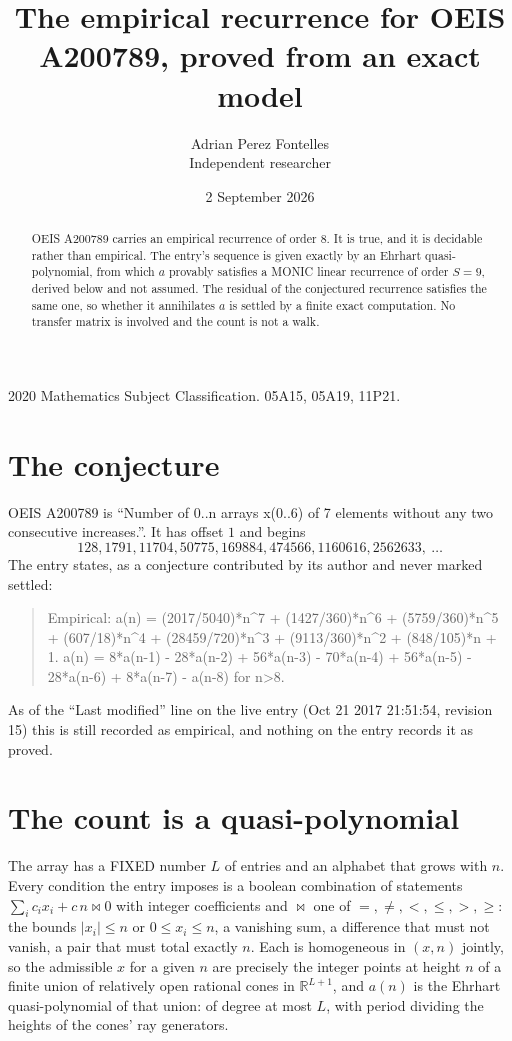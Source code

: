 \documentclass[11pt,a4paper]{article}
\title{The empirical recurrence for OEIS A200789, proved from an exact model}
\author{Adrian Perez Fontelles\\ \small Independent researcher}
\date{2 September 2026}
\theoremstyle{plain}
\theoremstyle{definition}
\begin{document}
\maketitle

\begin{abstract}
OEIS A200789 carries an empirical recurrence of order $8$. It is true, and it is
decidable rather than empirical. The entry's sequence is given exactly by an Ehrhart quasi-polynomial, from
which $a$ provably satisfies a MONIC linear recurrence of order $S=9$, derived below and not
assumed. The residual of the conjectured recurrence satisfies the same one, so whether it
annihilates $a$ is settled by a finite exact computation. No transfer matrix is involved and
the count is not a walk.
\end{abstract}

\noindent\small 2020 Mathematics Subject Classification. 05A15, 05A19, 11P21.\normalsize

\section{The conjecture}

OEIS A200789 is ``Number of 0..n arrays x(0..6) of 7 elements without any two consecutive increases.''. It has offset $1$ and begins
\[
128, 1791, 11704, 50775, 169884, 474566, 1160616, 2562633,\ \dots
\]
The entry states, as a conjecture contributed by its author and never marked settled:
\begin{quote}
Empirical: a(n) = (2017/5040)*n\^{}7 + (1427/360)*n\^{}6 + (5759/360)*n\^{}5 + (607/18)*n\^{}4 + (28459/720)*n\^{}3 + (9113/360)*n\^{}2 + (848/105)*n + 1. a(n) = 8*a(n-1) - 28*a(n-2) + 56*a(n-3) - 70*a(n-4) + 56*a(n-5) - 28*a(n-6) + 8*a(n-7) - a(n-8) for n>8.
\end{quote}
As of the ``Last modified'' line on the live entry (Oct 21 2017 21:51:54, revision 15)
this is still recorded as empirical, and nothing on the entry records it as proved.

\section{The count is a quasi-polynomial}

The array has a FIXED number $L$ of entries and an alphabet that grows with $n$. Every
condition the entry imposes is a boolean combination of statements
$\sum_i c_ix_i + c\,n \bowtie 0$ with integer coefficients and $\bowtie$ one of
$=,\ne,<,\le,>,\ge$: the bounds $|x_i|\le n$ or $0\le x_i\le n$, a vanishing sum, a difference
that must not vanish, a pair that must total exactly $n$. Each is homogeneous in $(x,n)$
jointly, so the admissible $x$ for a given $n$ are precisely the integer points at height $n$
of a finite union of relatively open rational cones in $\mathbb{R}^{L+1}$, and $a(n)$ is
the Ehrhart quasi-polynomial of that union: of degree at most $L$, with period dividing the
heights of the cones' ray generators.
\end{document}
